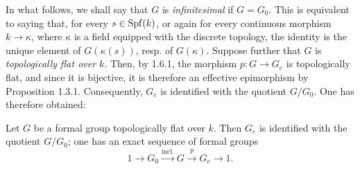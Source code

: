 In what follows, we shall say that $G$ is \emph{infinitesimal} if $G=G_0$. This is equivalent to saying that, for every $s\in\operatorname{Spf}(k)$, or again for every continuous morphism $k\to\kappa$, where $\kappa$ is a field equipped with the discrete topology, the identity is the unique element of $G(\kappa(s))$, resp. of $G(\kappa)$.
Suppose further that $G$ is \emph{topologically flat over $k$}. Then, by 1.6.1, the morphism $p:G\to G_e$ is topologically flat, and since it is bijective, it is therefore an effective epimorphism by Proposition 1.3.1. Consequently, $G_e$ is identified with the quotient $G/G_0$. One has therefore obtained:
\begin{corollary}{}
Let $G$ be a formal group topologically flat over $k$. Then $G_e$ is identified with the quotient $G/G_0$; \ie one has an exact sequence of formal groups
\[
1\to G_0\xrightarrow{\mathrm{incl.}}G\xrightarrow p G_e\to1.
\]
\end{corollary}

